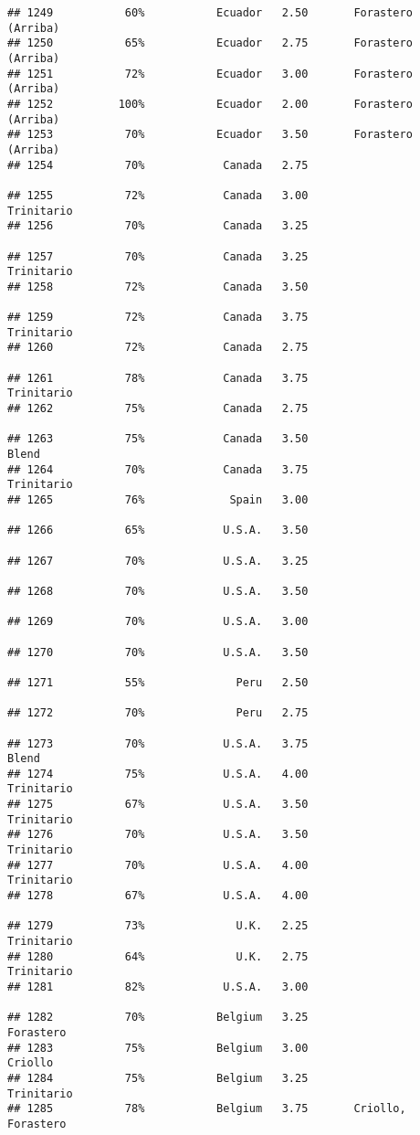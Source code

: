 \documentclass[
]{article}
\begin{document}
\begin{verbatim}
## 1249           60%           Ecuador   2.50       Forastero (Arriba)
## 1250           65%           Ecuador   2.75       Forastero (Arriba)
## 1251           72%           Ecuador   3.00       Forastero (Arriba)
## 1252          100%           Ecuador   2.00       Forastero (Arriba)
## 1253           70%           Ecuador   3.50       Forastero (Arriba)
## 1254           70%            Canada   2.75                         
## 1255           72%            Canada   3.00               Trinitario
## 1256           70%            Canada   3.25                         
## 1257           70%            Canada   3.25               Trinitario
## 1258           72%            Canada   3.50                         
## 1259           72%            Canada   3.75               Trinitario
## 1260           72%            Canada   2.75                         
## 1261           78%            Canada   3.75               Trinitario
## 1262           75%            Canada   2.75                         
## 1263           75%            Canada   3.50                    Blend
## 1264           70%            Canada   3.75               Trinitario
## 1265           76%             Spain   3.00                         
## 1266           65%            U.S.A.   3.50                         
## 1267           70%            U.S.A.   3.25                         
## 1268           70%            U.S.A.   3.50                         
## 1269           70%            U.S.A.   3.00                         
## 1270           70%            U.S.A.   3.50                         
## 1271           55%              Peru   2.50                         
## 1272           70%              Peru   2.75                         
## 1273           70%            U.S.A.   3.75                    Blend
## 1274           75%            U.S.A.   4.00               Trinitario
## 1275           67%            U.S.A.   3.50               Trinitario
## 1276           70%            U.S.A.   3.50               Trinitario
## 1277           70%            U.S.A.   4.00               Trinitario
## 1278           67%            U.S.A.   4.00                         
## 1279           73%              U.K.   2.25               Trinitario
## 1280           64%              U.K.   2.75               Trinitario
## 1281           82%            U.S.A.   3.00                         
## 1282           70%           Belgium   3.25                Forastero
## 1283           75%           Belgium   3.00                  Criollo
## 1284           75%           Belgium   3.25               Trinitario
## 1285           78%           Belgium   3.75       Criollo, Forastero

\end{verbatim}
\end{document}
